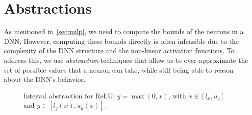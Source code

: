 \documentclass[oneside,11pt,dvipsnames]{book}
\numberwithin{equation}{section}
\theoremstyle{definition}
\theoremstyle{remark}
\newcommand{\tvn}[1]{\iftoggle{usecomment}{{\color{red}{[TVN]: #1}}}{}}
\begin{document}
\chapter{Abstractions}\label{chap:abstractions}


As mentioned in~\autoref{sec:milp}, we need to compute the bounds of the neurons in a DNN. However, computing these bounds directly is often infeasible due to the complexity of the DNN structure and the non-linear activation functions. To address this, we use \emph{abstraction} techniques that allow us to over-approximate the set of possible values that a neuron can take, while still being able to reason about the DNN's behavior.


\tvn{Hai, put in the Tikz picture showing different abstractions: ReLU, Interval, Zonotope, Polytope, etc.}
\begin{figure}[h]
    \centering
    
    \caption{Interval abstraction for ReLU: $y = \max(0, x)$, with $x \in [l_x, u_x]$ and $y \in [l_y(x), u_y(x)]$.}
    \label{fig:relu-interval-abstraction}
\end{figure}
\end{document}
